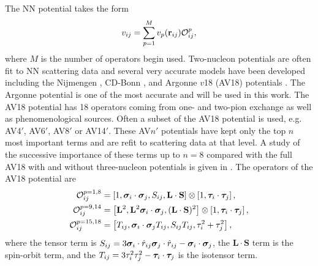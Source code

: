 The NN potential takes the form
\begin{equation}
   v_{ij} = \sum\limits_{p=1}^M v_p(\mathbf{r}_{ij})\mathcal{O}^p_{ij},
\end{equation}
where $M$ is the number of operators begin used.
Two-nucleon potentials are often fit to NN scattering data and several very accurate models have been developed including the Nijmengen \cite{nagels1975,stoks1994}, CD-Bonn \cite{machleidt1996,machleidt2001}, and Argonne $v$18 (AV18) potentials \cite{wiringa1984,wiringa1995}. The Argonne potential is one of the most accurate and will be used in this work. The AV18 potential has 18 operators coming from one- and two-pion exchange as well as phenomenological sources. Often a subset of the AV18 potential is used, e.g. AV4$'$, AV6$'$, AV8$'$ or AV14$'$. These AV$n'$ potentials have kept only the top $n$ most important terms and are refit to scattering data at that level. A study of the successive importance of these terms up to $n=8$ compared with the full AV18 with and without three-nucleon potentials is given in \cite{wiringa2002}. The operators of the AV18 potential are
\begin{align}
   \mathcal{O}_{ij}^{p=1,8} &= \left[1,\bm{\sigma}_i\cdot\bm{\sigma}_j,S_{ij},\mathbf{L}\cdot\mathbf{S}\right]\otimes\left[1,\bm{\tau}_i\cdot\bm{\tau}_j\right], \\
   \mathcal{O}_{ij}^{p=9,14} &= \left[\mathbf{L}^2,\mathbf{L}^2\bm{\sigma}_i\cdot\bm{\sigma}_j,(\mathbf{L}\cdot\mathbf{S})^2\right]\otimes\left[1,\bm{\tau}_i\cdot\bm{\tau}_j\right], \\
   \mathcal{O}_{ij}^{p=15,18} &= \left[T_{ij},\bm{\sigma}_i\cdot\bm{\sigma}_j T_{ij},S_{ij}T_{ij},\tau_i^2+\tau_j^2\right],
\end{align}
where the tensor term is $S_{ij} = 3\bm{\sigma}_i\cdot\hat{r}_{ij}\bm{\sigma}_j\cdot\hat{r}_{ij}-\bm{\sigma}_i\cdot\bm{\sigma}_j$, the $\mathbf{L}\cdot\mathbf{S}$ term is the spin-orbit term, and the $T_{ij} = 3\tau_i^2\tau_j^2-\bm{\tau}_i\cdot\bm{\tau}_j$ is the isotensor term.

